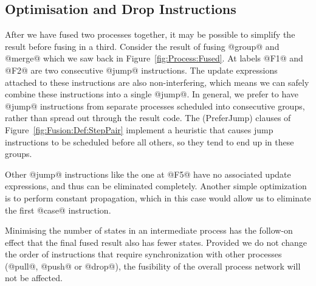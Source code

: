 %
%


\subsection{Optimisation and Drop Instructions}
\label{s:Optimisation}
After we have fused two processes together, it may be possible to simplify the result before fusing in a third. Consider the result of fusing @group@ and @merge@ which we saw back in Figure~\ref{fig:Process:Fused}. At labels @F1@ and @F2@ are two consecutive @jump@ instructions. The update expressions attached to these instructions are also non-interfering, which means we can safely combine these instructions into a single @jump@. In general, we prefer to have @jump@ instructions from separate processes scheduled into consecutive groups, rather than spread out through the result code. The (PreferJump) clauses of Figure~\ref{fig:Fusion:Def:StepPair} implement a heuristic that causes jump instructions to be scheduled before all others, so they tend to end up in these groups.

Other @jump@ instructions like the one at @F5@ have no associated update expressions, and thus can be eliminated completely. Another simple optimization is to perform constant propagation, which in this case would allow us to eliminate the first @case@ instruction. 

Minimising the number of states in an intermediate process has the follow-on effect that the final fused result also has fewer states. Provided we do not change the order of instructions that require synchronization with other processes (@pull@, @push@ or @drop@), the fusibility of the overall process network will not be affected.

